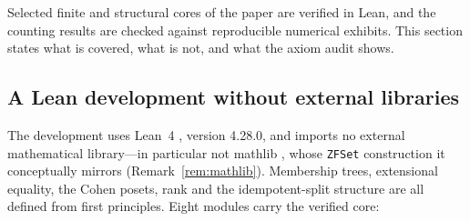 \documentclass[11pt]{article}
\theoremstyle{definition}
\begin{document}
Selected finite and structural cores of the paper are verified in Lean, and the counting results
are checked against reproducible numerical exhibits. This section states what is covered, what is
not, and what the axiom audit shows.

\subsection{A Lean development without external libraries}

The development uses Lean~4 \citep{deMouraUllrich2021}, version 4.28.0, and imports no external
mathematical library---in particular not \textsf{mathlib} \citep{Mathlib2020}, whose
\texttt{ZFSet} construction it conceptually mirrors (Remark~\ref{rem:mathlib}). Membership trees,
extensional equality, the Cohen posets, rank and the idempotent-split structure are all defined
from first principles. Eight modules carry the verified core:
\end{document}
